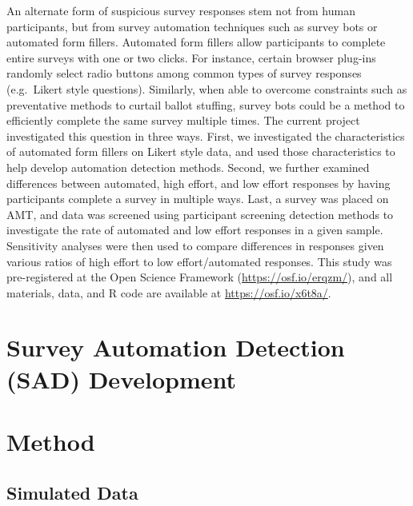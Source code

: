 \documentclass[english,man]{apa6}
\theoremstyle{definition}
\theoremstyle{definition}
\theoremstyle{definition}
\theoremstyle{remark}
\begin{document}
An alternate form of suspicious survey responses stem not from human
participants, but from survey automation techniques such as survey bots
or automated form fillers. Automated form fillers allow participants to
complete entire surveys with one or two clicks. For instance, certain
browser plug-ins randomly select radio buttons among common types of
survey responses (e.g.~Likert style questions). Similarly, when able to
overcome constraints such as preventative methods to curtail ballot
stuffing, survey bots could be a method to efficiently complete the same
survey multiple times. The current project investigated this question in
three ways. First, we investigated the characteristics of automated form
fillers on Likert style data, and used those characteristics to help
develop automation detection methods. Second, we further examined
differences between automated, high effort, and low effort responses by
having participants complete a survey in multiple ways. Last, a survey
was placed on AMT, and data was screened using participant screening
detection methods to investigate the rate of automated and low effort
responses in a given sample. Sensitivity analyses were then used to
compare differences in responses given various ratios of high effort to
low effort/automated responses. This study was pre-registered at the
Open Science Framework (\url{https://osf.io/erqzm/}), and all materials,
data, and R code are available at \url{https://osf.io/x6t8a/}.

\section{Survey Automation Detection (SAD)
Development}\label{survey-automation-detection-sad-development}

\section{Method}\label{method}

\subsection{Simulated Data}\label{simulated-data}
\end{document}

